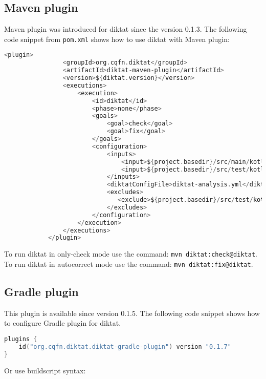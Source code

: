 \subsection{Maven plugin}
Maven plugin was introduced for diktat since the version 0.1.3. The following code snippet from \texttt{pom.xml} shows how to use diktat with Maven plugin:
\begin{lstlisting}[caption={DiKTat with Maven plugin}, label={lst:maven}, language=Kotlin]
          <plugin>
                <groupId>org.cqfn.diktat</groupId>
                <artifactId>diktat-maven-plugin</artifactId>
                <version>${diktat.version}</version>
                <executions>
                    <execution>
                        <id>diktat</id>
                        <phase>none</phase>
                        <goals>
                            <goal>check</goal>
                            <goal>fix</goal>
                        </goals>
                        <configuration>
                            <inputs>
                                <input>${project.basedir}/src/main/kotlin</input>
                                <input>${project.basedir}/src/test/kotlin</input>
                            </inputs>
                            <diktatConfigFile>diktat-analysis.yml</diktatConfigFile>
                            <excludes>
                               <exclude>${project.basedir}/src/test/kotlin/excluded</exclude>
                            </excludes>
                        </configuration>
                    </execution>
                </executions>
            </plugin>
\end{lstlisting}

To run diktat in only-check mode use the command: \texttt{mvn diktat:check@diktat}. To run diktat in autocorrect mode use the command: \texttt{mvn diktat:fix@diktat}.


\subsection{Gradle plugin}
This plugin is available since version 0.1.5. The following code snippet shows how to configure Gradle plugin for diktat.

\begin{lstlisting}[caption={DiKTat with Gradle plugin}, label={lst:gradle1}, language=Kotlin]
plugins {
    id("org.cqfn.diktat.diktat-gradle-plugin") version "0.1.7"
}
\end{lstlisting}

Or use buildscript syntax:

